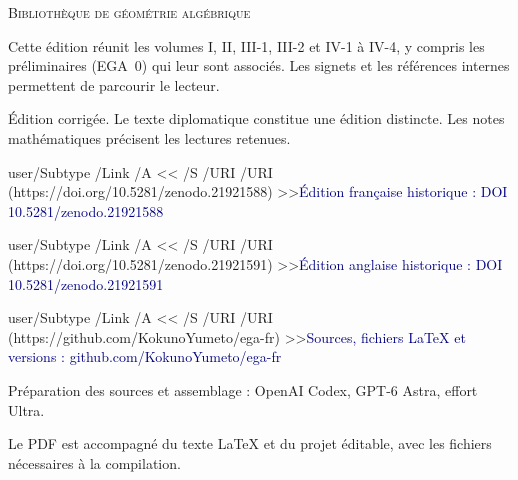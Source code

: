 \documentclass[11pt,a4paper]{article}
\newcommand{\editionlink}[2]{\leavevmode\pdfstartlink user{/Subtype /Link /A << /S /URI /URI (#1) >>}\textcolor{navy}{#2}\pdfendlink}
\begin{document}
\color{navy}
\noindent\textsc{Bibliothèque de géométrie algébrique}\par
\vspace{22mm}
\par
\vspace{9mm}
\par
\vspace{18mm}
\par
\vspace{3mm}
\par
\vspace{10mm}
\color{muted}
\noindent Cette édition réunit les volumes I, II, III-1, III-2 et IV-1 à IV-4,
y compris les préliminaires (EGA~0) qui leur sont associés.
Les signets et les références internes permettent de parcourir le lecteur.\par
\vspace{5mm}
\noindent Édition corrigée. Le texte diplomatique constitue une édition
distincte. Les notes mathématiques précisent les lectures retenues.\par
\vspace{9mm}
\noindent\editionlink{https://doi.org/10.5281/zenodo.21921588}{Édition française historique : DOI 10.5281/zenodo.21921588}\par
\vspace{3mm}
\noindent\editionlink{https://doi.org/10.5281/zenodo.21921591}{Édition anglaise historique : DOI 10.5281/zenodo.21921591}\par
\vspace{3mm}
\noindent\editionlink{https://github.com/KokunoYumeto/ega-fr}{Sources, fichiers LaTeX et versions : github.com/KokunoYumeto/ega-fr}\par
\vfill
\small
\noindent Préparation des sources et assemblage : OpenAI Codex,
GPT-6 Astra, effort Ultra.\par
\vspace{3mm}
\noindent Le PDF est accompagné du texte LaTeX et du projet éditable,
avec les fichiers nécessaires à la compilation.\par
\end{document}
